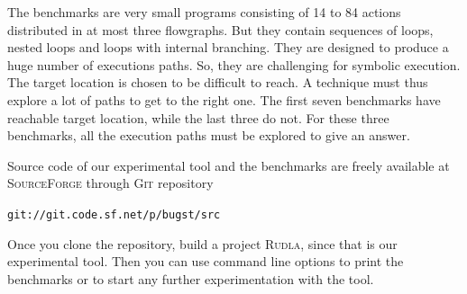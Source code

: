 \documentclass{sig-alternate}%
\begin{document}
The benchmarks are very small programs consisting of 14 to 84 actions
distributed in at most three flowgraphs. But they contain sequences of
loops, nested loops and loops with internal branching. They are
designed to produce a huge number of executions paths. So, they are
challenging for symbolic execution. The target location is chosen to
be difficult to reach. A technique must thus explore a lot of paths to
get to the right one. The first seven benchmarks have reachable target
location, while the last three do not. For these three benchmarks, all
the execution paths must be explored to give an answer.

Source code of our experimental tool and the benchmarks are freely
available at \textsc{SourceForge} through \textsc{Git} repository
\begin{center}
\texttt{git://git.code.sf.net/p/bugst/src}
\end{center}
Once you clone the repository, build a project \textsc{Rudla}, since
that is our experimental tool. Then you can use command line options
to print the benchmarks or to start any further experimentation with
the tool.
\end{document}
